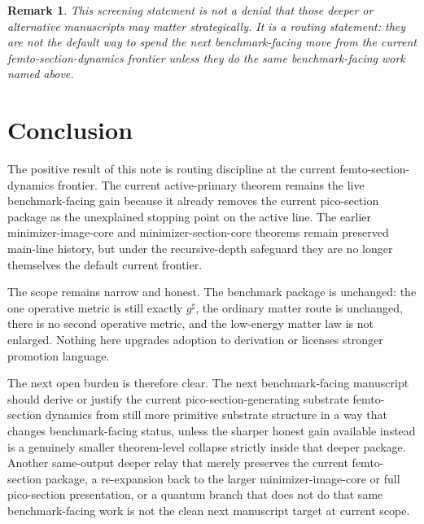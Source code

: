 \documentclass[11pt]{article}
\newcommand{\CompletedMetric}{g^{\sharp}}
\newtheorem{remark}{Remark}
\begin{document}
\begin{remark}
This screening statement is not a denial that those deeper or alternative manuscripts may matter strategically. It is a routing statement: they are not the default way to spend the next benchmark-facing move from the current femto-section-dynamics frontier unless they do the same benchmark-facing work named above.
\end{remark}

\section{Conclusion}

The positive result of this note is routing discipline at the current femto-section-dynamics frontier. The current active-primary theorem remains the live benchmark-facing gain because it already removes the current pico-section package as the unexplained stopping point on the active line. The earlier minimizer-image-core and minimizer-section-core theorems remain preserved main-line history, but under the recursive-depth safeguard they are no longer themselves the default current frontier.

The scope remains narrow and honest. The benchmark package is unchanged: the one operative metric is still exactly \(\CompletedMetric\), the ordinary matter route is unchanged, there is no second operative metric, and the low-energy matter law is not enlarged. Nothing here upgrades adoption to derivation or licenses stronger promotion language.

The next open burden is therefore clear. The next benchmark-facing manuscript should derive or justify the current pico-section-generating substrate femto-section dynamics from still more primitive substrate structure in a way that changes benchmark-facing status, unless the sharper honest gain available instead is a genuinely smaller theorem-level collapse strictly inside that deeper package. Another same-output deeper relay that merely preserves the current femto-section package, a re-expansion back to the larger minimizer-image-core or full pico-section presentation, or a quantum branch that does not do that same benchmark-facing work is not the clean next manuscript target at current scope.
\end{document}
